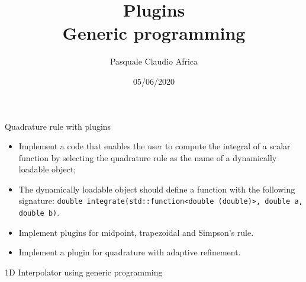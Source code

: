 \documentclass[10pt]{beamer}
\begin{document}
    \title{Plugins \protect\\ Generic programming}
    \author{Pasquale Claudio Africa}
    \date{05/06/2020}

\begin{frame}
    \maketitle
\end{frame}

\begin{frame}{Quadrature rule with plugins}
\begin{itemize}
\item Implement a code that enables the user to compute the integral of a scalar function by selecting the quadrature rule as the name of a dynamically loadable object;
\item The dynamically loadable object should define a function with the following signature:
\texttt{double integrate(std::function<double (double)>, double a, double b)}.
\item Implement plugins for midpoint, trapezoidal and Simpson's rule.
\item Implement a plugin for quadrature with adaptive refinement.
\end{itemize}
\end{frame}


\begin{frame}{1D Interpolator using generic programming}
\end{frame}
\end{document}
